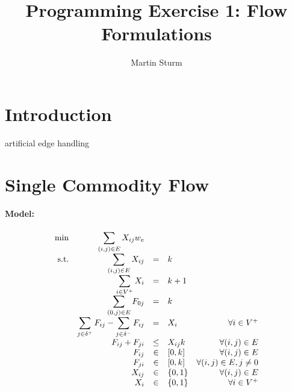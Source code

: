 \documentclass{article}
\begin{document}
\title{Programming Exercise 1: Flow Formulations}
\author{Martin Sturm}
\maketitle
              
\section{Introduction}
artificial edge handling

\section{Single Commodity Flow}

\paragraph{Model:}
\newcommand{\binaries}{\{0, 1\}}
\newcommand{\edgesum}{\displaystyle \sum_{(i, j) \in E}}
\newcommand{\nodesum}{\displaystyle \sum_{i \in V^+}}
\newcommand{\vflow}{F_{ij}}
\newcommand{\vflowrev}{F_{ji}}
\newcommand{\vedge}{X_{ij}}
\newcommand{\vnode}{X_{i}}


\begin{equation}
\begin{array}{r r c l r}
\displaystyle \min & \edgesum {\vedge w_e} \\
\textrm{s.t.}  

& \edgesum \vedge & = & k & \\
& \nodesum \vnode & = & k + 1 & \\
& \displaystyle \sum_{(0, j) \in E} F_{0j} & = & k& \\
& \displaystyle \sum_{j \in \delta^+} \vflow - \displaystyle \sum_{j \in \delta^-} \vflow& = & \vnode & \forall i \in V^+ \\
& \vflow + \vflowrev & \leq & \vedge k & \forall (i,j) \in E \\

& \vflow & \in & [0, k]  &  \forall (i,j) \in E\\
&\vflowrev & \in & [0, k]  &  \forall (i,j) \in E, j \neq 0\\
& \vedge & \in & \binaries  &  \forall (i,j) \in E\\
& \vnode & \in & \binaries  &  \forall i \in V^+\\

\end{array}
\end{equation}
\end{document}
